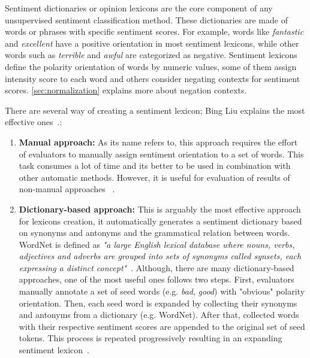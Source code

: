 { Sentiment dictionaries or opinion lexicons are the core component of any unsupervised sentiment classification method. These dictionaries are made of words or phrases with specific sentiment scores. For example, words like \textit{fantastic} and \textit{excellent} have a positive orientation in most sentiment lexicons, while other words such as \textit{terrible} and \textit{awful} are categorized as negative. Sentiment lexicons define the polarity orientation of words by numeric values, some of them assign intensity score to each word and others consider negating contexts for sentiment scores. \autoref{sec:normalization} explains more about negation contexts.
 
 There are several way of creating a sentiment lexicon; Bing Liu explains the most effective ones~\cite{liu2012sentiment}.: 
 \begin{enumerate}

\item \textbf{Manual approach:} As its name refers to, this approach requires the effort of evaluators to manually assign sentiment orientation to a set of words. This task consumes a lot of time and its better to be used in combination with other automatic methods. However, it is useful for evaluation of results of non-manual approaches ~\cite[p. 79]{liu2012sentiment}.

\item \textbf{Dictionary-based approach:} This is arguably the most effective approach for lexicons creation, it automatically generates a sentiment dictionary based on synonyms and antonyms and the grammatical relation between words. WordNet is defined as \textit{"a large English lexical database where nouns, verbs, adjectives and adverbs are grouped into sets of synonyms called synsets, each expressing a distinct concept"}~\cite{word2016}. Although, there are many dictionary-based approaches, one of the most useful ones follows two steps. First, evaluators manually annotate a set of seed words (e.g. \textit{bad}, \textit{good}) with "obvious" polarity orientation. Then, each seed word is expanded by collecting their synonyms and antonyms from a dictionary (e.g. WordNet). After that, collected words with their respective sentiment scores are appended to the original set of seed tokens. This process is repeated progressively resulting in an expanding sentiment lexicon~\cite[p. 80]{liu2012sentiment}.


\end{enumerate}}
